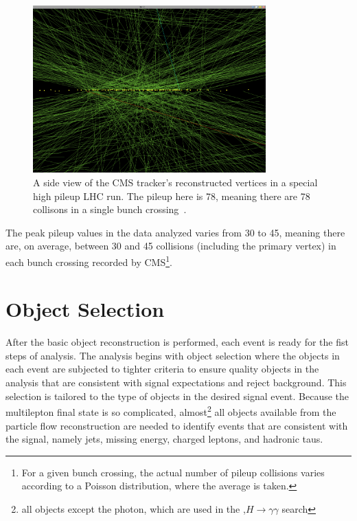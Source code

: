 \begin{figure}[hbtp]
 \begin{center}
   \includegraphics[width=0.8\textwidth]{ch4_figs/cms_pileup.pdf}
   \caption[Pileup vertices in the CMS tracker]{A side view of the CMS tracker's reconstructed vertices in a special high pileup LHC run. The pileup here is 78, meaning there are
78 collisons in a single bunch crossing~\cite{pileup_image}.}
   \label{fig:pileup_vertices}
 \end{center}
\end{figure}

\noindent The peak pileup values in the data analyzed varies from 30 to 45, meaning there are, on average, between 30 and 45 collisions (including the primary vertex) in each
bunch crossing recorded by CMS\footnote{For a given bunch crossing, the actual number of pileup collisions varies according to a Poisson distribution, where the average is taken.}. 

\section{Object Selection}
After the basic object reconstruction is performed, each event is ready for the fist steps of analysis. The analysis begins with object selection where the objects in each
event are subjected to tighter criteria to ensure quality objects in the analysis that are consistent with signal expectations and reject background. This selection is tailored
to the type of objects in the desired signal event. Because the \tth multilepton final state is so complicated, almost\footnote{all objects except the photon, which are
used in the \tth,$H\rightarrow\gamma\gamma$ search} all objects available from the particle flow
reconstruction are needed to identify events that are consistent with the signal, namely jets, missing energy, charged leptons, and hadronic taus.


